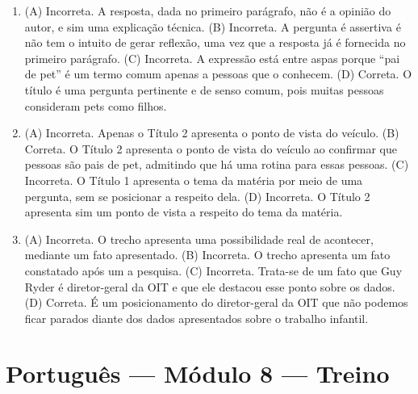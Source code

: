 \begin{enumerate}
\item (A) Incorreta. A resposta, dada no primeiro parágrafo, não é a opinião do
autor, e sim uma explicação técnica.
(B) Incorreta. A pergunta é assertiva é não tem o intuito de gerar
reflexão, uma vez que a resposta já é fornecida no primeiro parágrafo.
(C) Incorreta. A expressão está entre aspas porque ``pai de pet'' é um
termo comum apenas a pessoas que o conhecem.
(D) Correta. O título é uma pergunta pertinente e de senso comum, pois
muitas pessoas consideram pets como filhos.

\item (A) Incorreta. Apenas o Título 2 apresenta o ponto de vista do veículo.
(B) Correta. O Título 2 apresenta o ponto de vista do veículo ao
confirmar que pessoas são pais de pet, admitindo que há uma rotina para
essas pessoas.
(C) Incorreta. O Título 1 apresenta o tema da matéria por meio de uma
pergunta, sem se posicionar a respeito dela.
(D) Incorreta. O Título 2 apresenta sim um ponto de vista a respeito do
tema da matéria.

\item (A) Incorreta. O trecho apresenta uma possibilidade real de acontecer,
mediante um fato apresentado.
(B) Incorreta. O trecho apresenta um fato constatado após um a pesquisa.
(C) Incorreta. Trata-se de um fato que Guy Ryder é diretor-geral da OIT e
que ele destacou esse ponto sobre os dados.
(D) Correta. É um posicionamento do diretor-geral da OIT que não podemos
ficar parados diante dos dados apresentados sobre o trabalho infantil.
\end{enumerate}

\section*{Português — Módulo 8 — Treino}

